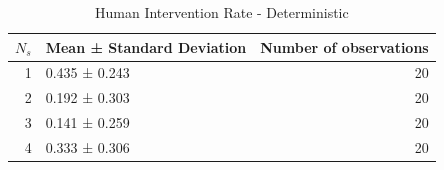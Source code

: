 \begin{table}
\caption{Human Intervention Rate - Deterministic}
\label{tab:human_intervention_rate_deterministic}
\begin{tabular}{rlr}
\toprule
$N_s$ & Mean ± Standard Deviation & Number of observations \\
\midrule
1 & 0.435 ± 0.243 & 20 \\
2 & 0.192 ± 0.303 & 20 \\
3 & 0.141 ± 0.259 & 20 \\
4 & 0.333 ± 0.306 & 20 \\
\bottomrule
\end{tabular}
\end{table}

